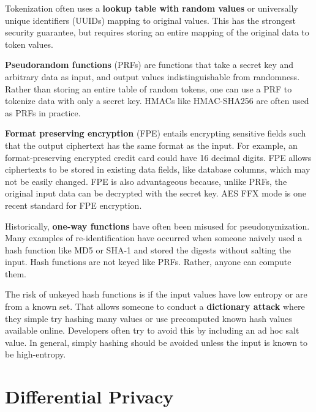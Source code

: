 \documentclass[nobib]{tufte-handout}
\begin{document}
Tokenization often uses a \textbf{lookup table with random values} or
universally unique identifiers (UUIDs) mapping to original values. This has the
strongest security guarantee, but requires storing an entire mapping of the
original data to token values.

 \textbf{Pseudorandom functions} (PRFs) are functions that take a secret key and
 arbitrary data as input, and output values indistinguishable from randomness.
 Rather than storing an entire table of random tokens, one can use a PRF to
 tokenize data with only a secret key. HMACs like HMAC-SHA256 are often used
 as PRFs in practice.

\textbf{Format preserving encryption} \cite{DBLP:conf/sacrypt/BellareRRS09}
(FPE) entails encrypting sensitive fields such that the output ciphertext has
the same format as the input. For example, an format-preserving encrypted credit
card could have 16 decimal digits. FPE allows ciphertexts to be stored in
existing data fields, like database columns, which may not be easily changed.
FPE is also advantageous because, unlike PRFs, the original input data can be
decrypted with the secret key. AES FFX mode \cite{dworkin2016recommendation}
is one recent standard for FPE encryption.


Historically, \textbf{one-way functions} have often been misused for
pseudonymization. Many examples of re-identification have occurred when someone
naively used a hash function like MD5 or SHA-1 and stored the digests without
salting the input. Hash functions are not keyed like PRFs. Rather, anyone can
compute them.

The risk of unkeyed hash functions is if the input values have low entropy or
are from a known set. That allows someone to conduct a \textbf{dictionary
attack} where they simple try hashing many values or use precomputed known hash
values available online. Developers often try to avoid this by including an ad
hoc salt value. In general, simply hashing should be avoided unless the input is
known to be high-entropy.

\section{Differential Privacy}
\end{document}
